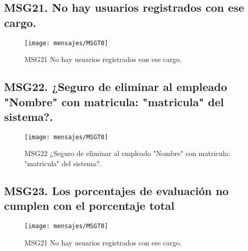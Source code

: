 \subsection{MSG21. No hay usuarios registrados con ese cargo.}
    \begin{figure}[htbp]
        \begin{center}
            \texttt{[image: mensajes/MSGT0]}
            \caption{ MSG21 No hay usuarios registrados con ese cargo.}
            \label{fig:MSG21}
        \end{center}
    \end{figure}


\subsection{MSG22. ¿Seguro de eliminar al empleado "Nombre" con matricula: "matricula" del sistema?.}
    \begin{figure}[htbp]
        \begin{center}
            \texttt{[image: mensajes/MSGT0]}
            \caption{MSG22 ¿Seguro de eliminar al empleado "Nombre" con matricula: "matricula" del sistema?.}
            \label{fig:MSG22}
        \end{center}
    \end{figure}
    
\subsection{MSG23. Los porcentajes de evaluación no cumplen con el porcentaje total}
    \begin{figure}[htbp]
        \begin{center}
            \texttt{[image: mensajes/MSGT0]}
            \caption{ MSG21 No hay usuarios registrados con ese cargo.}
            \label{fig:MSG21}
        \end{center}
    \end{figure}